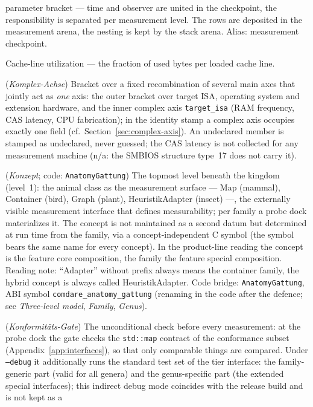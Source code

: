 \begin{description}
  parameter bracket --- time and observer are united in the checkpoint, the responsibility is
  separated per measurement level. The rows are deposited in the measurement arena, the nesting is
  kept by the stack arena. Alias: measurement checkpoint.
  \item[CLU] Cache-line utilization --- the fraction of used bytes per loaded cache line.
  \item[Complex axis] (\emph{Komplex-Achse}) Bracket over a fixed recombination of several main
  axes that jointly act as \emph{one} axis: the outer bracket over target ISA, operating system and
  extension hardware, and the inner complex axis \texttt{target\_isa} (RAM frequency, CAS latency,
  CPU fabrication); in the identity stamp a complex axis occupies exactly one field
  (cf.\ Section~\ref{sec:complex-axis}). An undeclared member is stamped as undeclared, never
  guessed; the CAS latency is not collected for any measurement machine (n/a: the SMBIOS structure
  type~17 does not carry it).
  \item[Concept] (\emph{Konzept}; code: \texttt{AnatomyGattung}) The topmost level beneath the
  kingdom (level~1): the animal class as the measurement surface --- Map (mammal), Container (bird),
  Graph (plant), HeuristikAdapter (insect) ---, the externally visible measurement interface that
  defines measurability; per family a probe dock materializes it. The concept is not maintained as a
  second datum but determined at run time from the family, via a concept-independent C symbol (the
  symbol bears the same name for every concept). In the product-line reading the concept is the
  feature core composition, the family the feature special composition. Reading note:
  \enquote{Adapter} without prefix always means the container family, the hybrid concept is always
  called HeuristikAdapter. Code bridge: \texttt{AnatomyGattung}, ABI symbol
  \texttt{comdare\_anatomy\_gattung} (renaming in the code after the defence; see
  \emph{Three-level model}, \emph{Family}, \emph{Genus}).
  \item[Conformance gate] (\emph{Konformitäts-Gate}) The unconditional check before every
  measurement: at the probe dock the gate checks the \texttt{std::map} contract of the conformance
  subset (Appendix~\ref{app:interfaces}), so that only comparable things are compared. Under
  \texttt{--debug} it additionally runs the standard test set of the tier interface: the
  family-generic part (valid for all genera) and the genus-specific part (the extended
  special interfaces); this indirect debug mode coincides with the release build and is not kept as a

\end{description}
